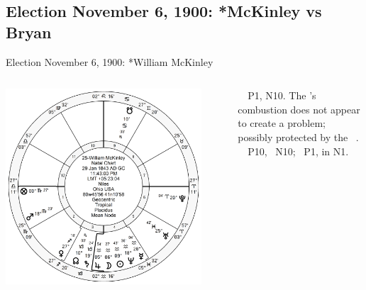 \subsection{Election November 6, 1900: *McKinley vs Bryan}
\begin{frame}[t]{Election November 6, 1900: *William McKinley}
\small
\begin{columns}[T, onlytextwidth]
\vspace{-1em}
{\includegraphics[width=0.9\textwidth]{charts/McKinley.png}}
\fontsize{7pt}{8pt}\selectfont

\Moon\, \Opposition\, P1, N10. The \Moon's combustion does not appear to create a problem; possibly protected by the \Jupiter\, \Conjunction. \\
\Mars\, \Opposition\, P10, \Square\, N10; \Square\, P1, in N1.


\end{columns}
\end{frame}

